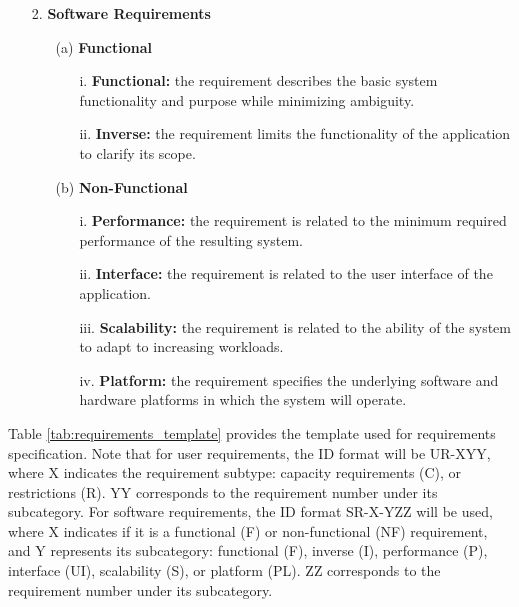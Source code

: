 \begin{itemize}
\item[2.] \textbf{Software Requirements}
	\begin{itemize}
	\item[(a)] 	\textbf{Functional}
		\begin{itemize}
		\item[i.] 	\textbf{Functional:} the requirement describes the basic system functionality and purpose while minimizing ambiguity.
		\item[ii.] 	\textbf{Inverse:} the requirement limits the functionality of the application to clarify its scope.
		\end{itemize}

	\item[(b)] 	\textbf{Non-Functional}
		\begin{itemize}
		\item[i.] 	\textbf{Performance:} the requirement is related to the minimum required performance of the resulting system.
		\item[ii.] 	\textbf{Interface:} the requirement is related to the user interface of the application.
		\item[iii.] 	\textbf{Scalability:} the requirement is related to the ability of the system to adapt to increasing workloads.
		\item[iv.] 	\textbf{Platform:} the requirement specifies the underlying software and hardware platforms in which the system will operate.
		\end{itemize}			
	\end{itemize}
\end{itemize}

Table \ref{tab:requirements_template} provides the template used for requirements specification. Note that for user requirements, the ID format will be UR-XYY, where X indicates the requirement subtype: capacity requirements (C), or restrictions (R). YY corresponds to the requirement number under its subcategory. For software requirements, the ID format SR-X-YZZ will be used, where X indicates if it is a functional (F) or non-functional (NF) requirement, and Y represents its subcategory: functional (F), inverse (I), performance (P), interface (UI), scalability (S), or platform (PL). ZZ corresponds to the requirement number under its subcategory.

